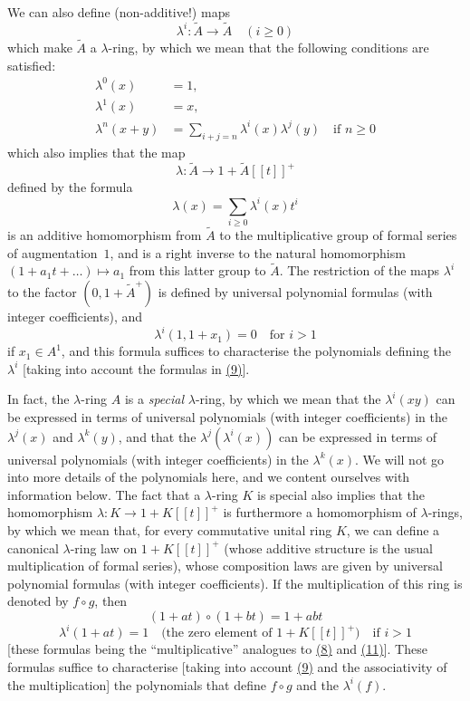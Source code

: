 \documentclass{article}
\renewcommand{\geq}{\geqslant}
\newcommand{\oldpage}[1]{\marginpar{\footnotesize$\Big\vert$ \textit{p.~#1}}}
\begin{document}
\begin{enumerate}
    We can also define (non-additive!) maps
    \[
      \lambda^i\colon \widetilde{A}\to\widetilde{A}
      \quad(i\geq0)
    \]
    which make $\widetilde{A}$ a $\lambda$-ring, by which we mean that the following conditions are satisfied:
    \[
    \label{equation9}
      \begin{aligned}
        \lambda^0(x) &= 1,
      \\\lambda^1(x) &= x,
      \\\lambda^n(x+y) &= \sum_{i+j=n}\lambda^i(x)\lambda^j(y)\quad\mbox{if $n\geq0$}
      \end{aligned}
    \tag{9}
    \]
    which also implies that the map
    \[
      \lambda\colon \widetilde{A} \to 1+\widetilde{A}[[t]]^+
    \]
    defined by the formula
    \[
    \label{equation10}
      \lambda(x) = \sum_{i\geq0} \lambda^i(x)t^i
    \tag{10}
    \]
    is an additive homomorphism from $\widetilde{A}$ to the multiplicative group of formal series of augmentation~$1$, and is a right inverse to the natural homomorphism $(1+a_1t+\ldots)\mapsto a_1$ from this latter group to $\widetilde{A}$.
    The restriction of the maps $\lambda^i$ to the factor $(0,1+\widetilde{A}^+)$ is defined by universal polynomial formulas (with integer coefficients), and
    \[
    \label{equation11}
      \lambda^i(1,1+x_1) = 0
      \quad\mbox{for $i>1$}
    \tag{11}
    \]
    if $x_1\in A^1$, and this formula suffices to characterise the polynomials defining the $\lambda^i$ [taking into account the formulas in \hyperref[equation9]{(9)}].

\oldpage{149}
    In fact, the $\lambda$-ring $A$ is a \emph{special} $\lambda$-ring, by which we mean that the $\lambda^i(xy)$ can be expressed in terms of universal polynomials (with integer coefficients) in the $\lambda^j(x)$ and $\lambda^k(y)$, and that the $\lambda^j(\lambda^i(x))$ can be expressed in terms of universal polynomials (with integer coefficients) in the $\lambda^k(x)$.
    We will not go into more details of the polynomials here, and we content ourselves with information below.
    The fact that a $\lambda$-ring $K$ is special also implies that the homomorphism $\lambda\colon K\to 1+K[[t]]^+$ is furthermore a homomorphism of $\lambda$-rings, by which we mean that, for every commutative unital ring $K$, we can define a canonical $\lambda$-ring law on $1+K[[t]]^+$ (whose additive structure is the usual multiplication of formal series), whose composition laws are given by universal polynomial formulas (with integer coefficients).
    If the multiplication of this ring is denoted by $f\circ g$, then
    \[
    \label{equation12}
      (1+at)\circ(1+bt) = 1+abt
    \tag{12}
    \]
    \[
    \label{equation13}
      \lambda^i(1+at) = 1
      \quad\mbox{(the zero element of $1+K[[t]]^+$)}
      \quad\mbox{if $i>1$}
    \tag{13}
    \]
    [these formulas being the ``multiplicative'' analogues to \hyperref[equation8]{(8)} and \hyperref[equation11]{(11)}].
    These formulas suffice to characterise [taking into account \hyperref[equation9]{(9)} and the associativity of the multiplication] the polynomials that define $f\circ g$ and the $\lambda^i(f)$.


\end{enumerate}
\end{document}

